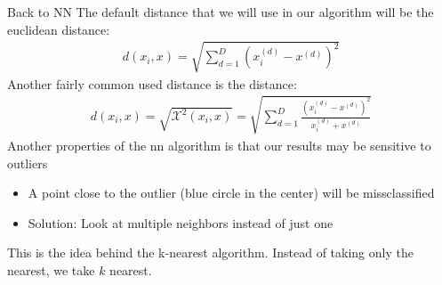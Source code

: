 \begin{parag}{Back to NN}
    The default distance that we will use in our algorithm will be the euclidean distance:
	\begin{align*} 
		d\left(x_i,x\right) = \sqrt{\sum_{d = 1}^{D}\left(x_i^{\left(d\right)} - x^{\left(d\right)}\right)^2}
	\end{align*}
	Another fairly common used distance is the  distance:
	\begin{align*} 
		d\left(x_i, x\right) = \sqrt{\mathcal{X}^2\left(x_i, x\right)} = \sqrt{\sum_{d = 1}^{D}\frac{\left(x_i^{\left(d\right)} - x^{\left(d\right)}\right)^2}{x_i^{\left(d\right)} + x^{\left(d\right)}}}
	\end{align*}
	Another properties of the nn algorithm is that our results may be sensitive to outliers
	\begin{itemize}
	    \item A point close to the outlier (blue circle in the center) will be missclassified
	    \item Solution: Look at multiple neighbors instead of just one
	\end{itemize}
	This is the idea behind the k-nearest algorithm. Instead of taking only the nearest, we take $k$ nearest.
	
\end{parag}


